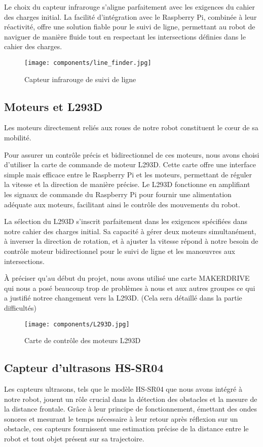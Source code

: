 Le choix du capteur infrarouge s'aligne parfaitement avec les exigences du cahier des charges initial. La facilité d'intégration avec le Raspberry Pi, combinée à leur réactivité, offre une solution fiable pour le suivi de ligne, permettant au robot de naviguer de manière fluide tout en respectant les intersections définies dans le cahier des charges.

\begin{figure}[h]
    \centering
    \texttt{[image: components/line\_finder.jpg]}
    \caption{Capteur infrarouge de suivi de ligne}
    \label{fig:TCRT5000}
\end{figure}

\subsection{Moteurs et L293D}
Les moteurs directement reliés aux roues de notre robot constituent le cœur de sa mobilité.

Pour assurer un contrôle précis et bidirectionnel de ces moteurs, nous avons choisi d'utiliser la carte de commande de moteur L293D. Cette carte offre une interface simple mais efficace entre le Raspberry Pi et les moteurs, permettant de réguler la vitesse et la direction de manière précise. Le L293D fonctionne en amplifiant les signaux de commande du Raspberry Pi pour fournir une alimentation adéquate aux moteurs, facilitant ainsi le contrôle des mouvements du robot.

La sélection du L293D s'inscrit parfaitement dans les exigences spécifiées dans notre cahier des charges initial. Sa capacité à gérer deux moteurs simultanément, à inverser la direction de rotation, et à ajuster la vitesse répond à notre besoin de contrôle moteur bidirectionnel pour le suivi de ligne et les manœuvres aux intersections.

À préciser qu'au début du projet, nous avons utilisé une carte MAKERDRIVE qui nous a posé beaucoup trop de problèmes à nous et aux autres groupes ce qui a justifié notree changement vers la L293D. (Cela sera détaillé dans la partie difficultés)

\begin{figure}[h]
    \centering
    \texttt{[image: components/L293D.jpg]}
    \caption{Carte de contrôle des moteurs L293D}
    \label{fig:L293D}
\end{figure}

\subsection{Capteur d'ultrasons HS-SR04}
Les capteurs ultrasons, tels que le modèle HS-SR04 que nous avons intégré à notre robot, jouent un rôle crucial dans la détection des obstacles et la mesure de la distance frontale. Grâce à leur principe de fonctionnement, émettant des ondes sonores et mesurant le temps nécessaire à leur retour après réflexion sur un obstacle, ces capteurs fournissent une estimation précise de la distance entre le robot et tout objet présent sur sa trajectoire.

